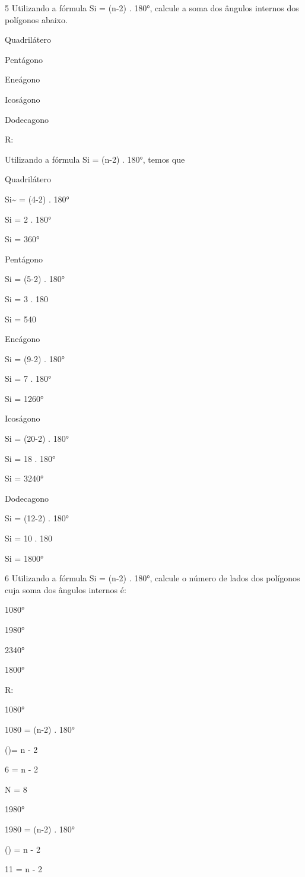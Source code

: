 {\num{5} Utilizando a fórmula Si = (n-2) . 180°, calcule a soma dos ângulos
internos dos polígonos abaixo.
\item Quadrilátero
\item Pentágono
\item Eneágono
\item Icoságono
\item Dodecagono

R:

Utilizando a fórmula Si = (n-2) . 180°, temos que
\item Quadrilátero

Si\textasciitilde{} = (4-2) . 180°

Si = 2 . 180°

Si = 360°
\item Pentágono

Si = (5-2) . 180°

Si = 3 . 180

Si = 540
\item Eneágono

Si = (9-2) . 180°

Si = 7 . 180°

Si = 1260°
\item Icoságono

Si = (20-2) . 180°

Si = 18 . 180°

Si = 3240°
\item Dodecagono

Si = (12-2) . 180°

Si = 10 . 180

Si = 1800°

\num{6} Utilizando a fórmula Si = (n-2) . 180°, calcule o número de lados dos
polígonos cuja soma dos ângulos internos é:
\item 1080°
\item 1980°
\item 2340°
\item 1800°

R:
\item 1080°

1080 = (n-2) . 180°

()= n - 2

6 = n - 2

N = 8
\item 1980°

1980 = (n-2) . 180°

() = n - 2

11 = n - 2

}
